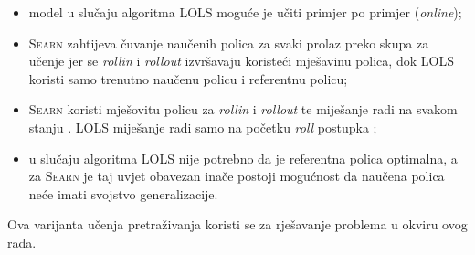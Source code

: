 \begin{itemize}
  \item model u slučaju algoritma \textsc{LOLS} moguće je učiti primjer po
  primjer (\textit{online});

  \item \textsc{Searn} zahtijeva čuvanje naučenih polica za svaki prolaz preko
  skupa za učenje jer se \emph{rollin} i \emph{rollout} izvršavaju koristeći
  mješavinu polica, dok \textsc{LOLS} koristi samo trenutno naučenu policu i
  referentnu policu;

  \item \textsc{Searn} koristi mješovitu policu za \emph{rollin} i
  \emph{rollout} te miješanje radi na svakom stanju .
  \textsc{LOLS} miješanje radi samo na početku \emph{roll} postupka
  ;

  \item u slučaju algoritma \textsc{LOLS} nije potrebno da je referentna polica
  optimalna, a za \textsc{Searn} je taj uvjet obavezan inače postoji mogućnost
  da naučena polica neće imati svojstvo generalizacije.

\end{itemize}

\noindent
Ova varijanta učenja pretraživanja koristi se za rješavanje problema u okviru
ovog rada.
